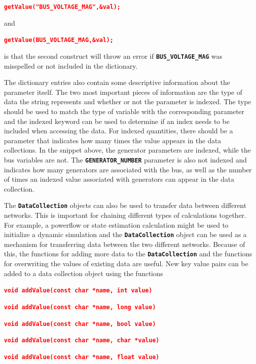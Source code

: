 \documentclass[12pt]{report} %
\begin{document}
\textcolor{red}{\texttt{\textbf{getValue("BUS\_VOLTAGE\_MAG",\&val);}}}

and

\textcolor{red}{\texttt{\textbf{getValue(BUS\_VOLTAGE\_MAG,\&val);}}}

is that the second construct will throw an error if \texttt{\textbf{BUS\_VOLTAGE\_MAG}} was misspelled or not included in the dictionary.

The dictionary entries also contain some descriptive information about the parameter itself. The two most important pieces of information are the type of data the string represents and whether or not the parameter is indexed. The type should be used to match the type of variable with the corresponding parameter and the indexed keyword can be used to determine if an index needs to be included when accessing the data. For indexed quantities, there should be a parameter that indicates how many times the value appears in the data collections. In the snippet above, the generator parameters are indexed, while the bus variables are not. The \texttt{\textbf{GENERATOR\_NUMBER}} parameter is also not indexed and indicates how many generators are associated with the bus, as well as the number of times an indexed value associated with generators can appear in the data collection.

The \texttt{\textbf{DataCollection}} objects can also be used to transfer data between different networks. This is important for chaining different types of calculations together. For example, a powerflow or state estimation calculation might be used to initialize a dynamic simulation and the \texttt{\textbf{DataCollection}} object can be used as a mechanism for transferring data between the two different networks. Because of this, the functions for adding more data to the \texttt{\textbf{DataCollection}} and the functions for overwriting the values of existing data are useful. New key value pairs can be added to a data collection object using the functions

\textcolor{red}{\texttt{\textbf{void addValue(const char *name, int value)}}}

\textcolor{red}{\texttt{\textbf{void addValue(const char *name, long value)}}}

\textcolor{red}{\texttt{\textbf{void addValue(const char *name, bool value)}}}

\textcolor{red}{\texttt{\textbf{void addValue(const char *name, char *value)}}}

\textcolor{red}{\texttt{\textbf{void addValue(const char *name, float value)}}}
\end{document}
